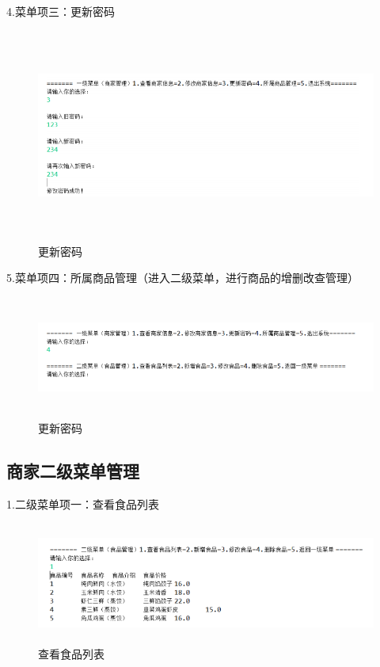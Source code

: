 \noindent
4.菜单项三：更新密码

\begin{figure}[H]
    \centering
    \includegraphics[width=15cm,height=7cm]{figures/jdbc9.png}
    \caption{更新密码}
\end{figure}

\noindent
5.菜单项四：所属商品管理（进入二级菜单，进行商品的增删改查管理）

\begin{figure}[H]
    \centering
    \includegraphics[width=15cm,height=4cm]{figures/jdbc10.png}
    \caption{更新密码}
\end{figure}


\subsection{商家二级菜单管理}
\noindent
1.二级菜单项一：查看食品列表

\begin{figure}[H]
    \centering
    \includegraphics[width=15cm,height=4cm]{figures/jdbc11.png}
    \caption{查看食品列表}
\end{figure}

